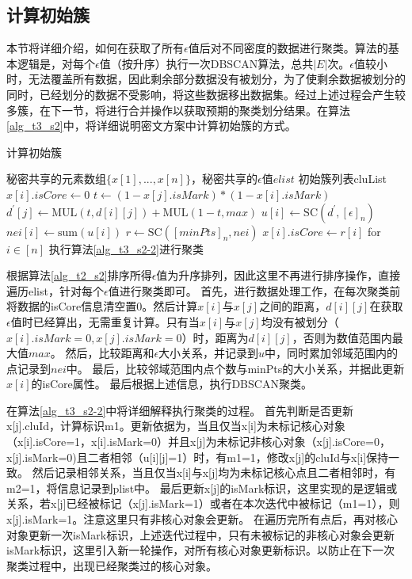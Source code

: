 \subsection{计算初始簇}
本节将详细介绍，如何在获取了所有$\epsilon$值后对不同密度的数据进行聚类。算法的基本逻辑是，对每个$\epsilon$值（按升序）执行一次DBSCAN算法，总共$|E|$次。$\epsilon$值较小时，无法覆盖所有数据，因此剩余部分数据没有被划分，为了使剩余数据被划分的同时，已经划分的数据不受影响，将这些数据移出数据集。经过上述过程会产生较多簇，在下一节，将进行合并操作以获取预期的聚类划分结果。在算法\ref{alg_t3_s2}中，将详细说明密文方案中计算初始簇的方式。

\begin{algorithm}[htbp]
	\renewcommand{\algorithmicrequire}{\textbf{输入:}}
	\renewcommand{\algorithmicensure}{\textbf{输出:}}
	\caption{计算初始簇}
	\label{alg_t3_s2} %
	\begin{algorithmic}[1]
		\REQUIRE 秘密共享的元素数组$ \{x[1],...,x[n]\} $，秘密共享的$\epsilon$值$ elist $
		\ENSURE 初始簇列表cluList
		\STATE $x[i].isCore \leftarrow 0$ %
		\STATE $t \leftarrow ( 1- x[j].isMark) * (1-x[i].isMark)$
		\STATE $d^{\prime}[j] \leftarrow \text{MUL}(t,d[i][j])+\text{MUL}(1-t,max)$
		\ENDFOR
		\STATE $u[i] \leftarrow \text{SC}(d^{\prime},[\epsilon]_n)$
		\STATE $nei[i] \leftarrow \text{sum}(u[i])$
		\ENDFOR
		\STATE $r \leftarrow \text{SC}([minPts]_n, nei)$
		\STATE $x[i].isCore \leftarrow r[i]$ for $i\in[n]$
		\STATE 执行算法\ref{alg_t3_s2-2}进行聚类
		\ENDFOR
	\end{algorithmic}
\end{algorithm}

根据算法\ref{alg_t2_s2}排序所得$\epsilon$值为升序排列，因此这里不再进行排序操作，直接遍历elist，针对每个$\epsilon$值进行聚类即可。
首先，进行数据处理工作，在每次聚类前将数据的isCore信息清空置0。然后计算$x[i]$与$x[j]$之间的距离，$d[i][j]$在获取$\epsilon$值时已经算出，无需重复计算。只有当$x[i]$与$x[j]$均没有被划分（$x[i].isMark=0,x[j].isMark=0$）时，距离为$d[i][j]$，否则为数值范围内最大值$max$。
然后，比较距离和$\epsilon$大小关系，并记录到$u$中，同时累加邻域范围内的点记录到$nei$中。
最后，比较邻域范围内点个数与minPts的大小关系，并据此更新$x[i]$的isCore属性。
最后根据上述信息，执行DBSCAN聚类。

在算法\ref{alg_t3_s2-2}中将详细解释执行聚类的过程。
首先判断是否更新x[j].cluId，计算标识m1。更新依据为，当且仅当x[i]为未标记核心对象（x[i].isCore=1，x[i].isMark=0）并且x[j]为未标记非核心对象（x[j].isCore=0，x[j].isMark=0)且二者相邻（u[i][j]=1）时，有m1=1，修改x[j]的cluId与x[i]保持一致。
然后记录相邻关系，当且仅当x[i]与x[j]均为未标记核心点且二者相邻时，有m2=1，将信息记录到plist中。
最后更新x[j]的isMark标识，这里实现的是逻辑或关系，若x[j]已经被标记（x[j].isMark=1）或者在本次迭代中被标记（m1=1），则x[j].isMark=1。注意这里只有非核心对象会更新。
在遍历完所有点后，再对核心对象更新一次isMark标识，上述迭代过程中，只有未被标记的非核心对象会更新isMark标识，这里引入新一轮操作，对所有核心对象更新标识。以防止在下一次聚类过程中，出现已经聚类过的核心对象。

